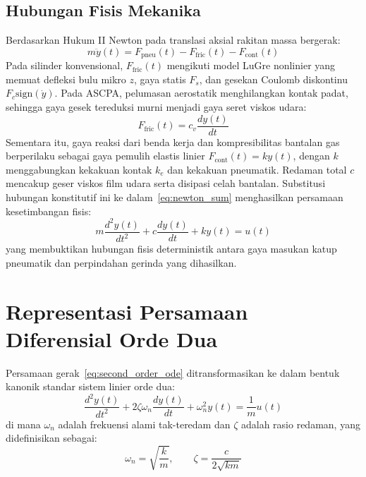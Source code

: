 \documentclass[journal]{IEEEtran}
\begin{document}
\subsection{Hubungan Fisis Mekanika}
Berdasarkan Hukum II Newton pada translasi aksial rakitan massa bergerak:
\begin{equation}
    m \ddot{y}(t) = F_{\text{pneu}}(t) - F_{\text{fric}}(t) - F_{\text{cont}}(t)
    \label{eq:newton_sum}
\end{equation}
Pada silinder konvensional, $F_{\text{fric}}(t)$ mengikuti model LuGre nonlinier yang memuat defleksi bulu mikro $z$, gaya statis $F_s$, dan gesekan Coulomb diskontinu $F_c \text{sign}(\dot{y})$. Pada ASCPA, pelumasan aerostatik menghilangkan kontak padat, sehingga gaya gesek tereduksi murni menjadi gaya seret viskos udara:
\begin{equation}
    F_{\text{fric}}(t) = c_v \frac{dy(t)}{dt}
    \label{eq:viscous_fric}
\end{equation}
Sementara itu, gaya reaksi dari benda kerja dan kompresibilitas bantalan gas berperilaku sebagai gaya pemulih elastis linier $F_{\text{cont}}(t) = k y(t)$, dengan $k$ menggabungkan kekakuan kontak $k_e$ dan kekakuan pneumatik. Redaman total $c$ mencakup geser viskos film udara serta disipasi celah bantalan. Substitusi hubungan konstitutif ini ke dalam~\eqref{eq:newton_sum} menghasilkan persamaan kesetimbangan fisis:
\begin{equation}
    m \frac{d^2 y(t)}{dt^2} + c \frac{dy(t)}{dt} + k y(t) = u(t)
    \label{eq:second_order_ode}
\end{equation}
yang membuktikan hubungan fisis deterministik antara gaya masukan katup pneumatik dan perpindahan gerinda yang dihasilkan.

\section{Representasi Persamaan Diferensial Orde Dua}
Persamaan gerak~\eqref{eq:second_order_ode} ditransformasikan ke dalam bentuk kanonik standar sistem linier orde dua:
\begin{equation}
    \frac{d^2 y(t)}{dt^2} + 2\zeta \omega_n \frac{dy(t)}{dt} + \omega_n^2 y(t) = \frac{1}{m} u(t)
    \label{eq:canonical_ode}
\end{equation}
di mana $\omega_n$ adalah frekuensi alami tak-teredam dan $\zeta$ adalah rasio redaman, yang didefinisikan sebagai:
\begin{equation}
    \omega_n = \sqrt{\frac{k}{m}}, \qquad \zeta = \frac{c}{2\sqrt{k m}}
    \label{eq:wn_zeta_def}
\end{equation}
\end{document}
